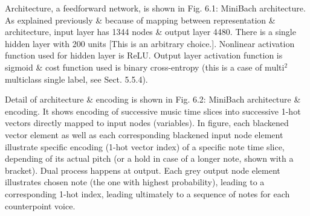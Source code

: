 \documentclass{article}
\begin{document}
\begin{itemize}
\begin{itemize}
\begin{itemize}
			Architecture, a feedforward network, is shown in {\sf Fig. 6.1: MiniBach architecture}. As explained previously \& because of mapping between representation \& architecture, input layer has 1344 nodes \& output layer 4480. There is a single hidden layer with 200 units [This is an arbitrary choice.]. Nonlinear activation function used for hidden layer is ReLU. Output layer activation function is sigmoid \& cost function used is binary cross-entropy (this is a case of multi${}^2$ multiclass single label, see Sect. 5.5.4).
			
			Detail of architecture \& encoding is shown in {\sf Fig. 6.2: MiniBach architecture \& encoding}. It shows encoding of successive music time slices into successive 1-hot vectors directly mapped to input nodes (variables). In figure, each blackened vector element as well as each corresponding blackened input node element illustrate specific encoding (1-hot vector index) of a specific note time slice, depending of its actual pitch (or a hold in case of a longer note, shown with a bracket). Dual process happens at output. Each grey output node element illustrates chosen note (the one with highest probability), leading to a corresponding 1-hot index, leading ultimately to a sequence of notes for each counterpoint voice.
			

\end{itemize}
\end{itemize}
\end{itemize}
\end{document}
